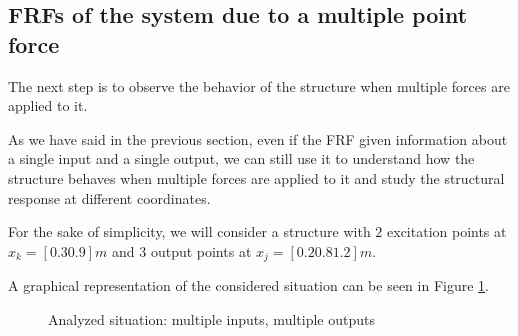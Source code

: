 \subsection{FRFs of the system due to a multiple point force}
\label{subsec:FRFs_of_the_system_due_to_multiple_point_force}

The next step is to observe the behavior of the structure when multiple forces are applied to it.

As we have said in the previous section, even if the FRF given information about a single input and a single output, we can still use it to understand how the structure behaves when multiple forces are applied to it and study the structural response at different coordinates.

For the sake of simplicity, we will consider a structure with $2$ excitation points at $x_k = [0.3 0.9]m$ and $3$ output points at $x_j = [0.2 0.8 1.2]m$.

A graphical representation of the considered situation can be seen in Figure \ref{fig:beam_multi_point_force}.

\begin{figure}[H]
    \centering
    \caption{Analyzed situation: multiple inputs, multiple outputs}
    \label{fig:beam_multi_point_force}
\end{figure}

